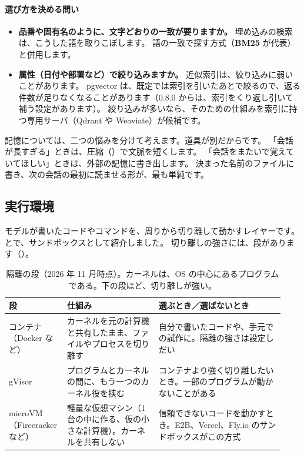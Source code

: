 \paragraph{選び方を決める問い}
\begin{itemize}[nosep,beginpenalty=10000]
\item \textbf{品番や固有名のように、文字どおりの一致が要りますか。}
  埋め込みの検索は、こうした語を取りこぼします。
  語の一致で探す方式（\textbf{BM25} が代表）と併用します。
\item \textbf{属性（日付や部署など）で絞り込みますか。}
  近似索引は、絞り込みに弱いことがあります。
  pgvector は、既定では索引を引いたあとで絞るので、返る件数が足りなくなることがあります（0.8.0 からは、索引をくり返し引いて補う設定があります）。
  絞り込みが多いなら、そのための仕組みを索引に持つ専用サーバ（Qdrant や Weaviate）が候補です。
\end{itemize}

記憶については、二つの悩みを分けて考えます。道具が別だからです。
「会話が長すぎる」ときは、圧縮（）で文脈を短くします。
「会話をまたいで覚えていてほしい」ときは、外部の記憶に書き出します。
決まった名前のファイルに書き、次の会話の最初に読ませる形が、最も単純です。

\subsection{実行環境}\label{sec:tm-sandbox}

モデルが書いたコードやコマンドを、周りから切り離して動かすレイヤーです。
とで、サンドボックスとして紹介しました。
切り離しの強さには、段があります（）。

\begin{table}[htbp]
\centering\footnotesize
\caption{隔離の段（2026 年 11 月時点）。カーネルは、OS の中心にあるプログラムである。下の段ほど、切り離しが強い。}
\label{tab:tm-sandbox}
\begin{tabular}{@{}>{\raggedright\arraybackslash}p{0.17\linewidth}>{\raggedright\arraybackslash}p{0.32\linewidth}>{\raggedright\arraybackslash}p{0.44\linewidth}@{}}
\toprule
段 & 仕組み & 選ぶとき／選ばないとき \\
\midrule
コンテナ（Docker など） & カーネルを元の計算機と共有したまま、ファイルやプロセスを切り離す & 自分で書いたコードや、手元での試作に。隔離の強さは設定しだい \\
\addlinespace[2pt]
gVisor & プログラムとカーネルの間に、もう一つのカーネル役を挟む & コンテナより強く切り離したいとき。一部のプログラムが動かないことがある \\
\addlinespace[2pt]
microVM（Firecracker など） & 軽量な仮想マシン（1 台の中に作る、仮の小さな計算機）。カーネルを共有しない & 信頼できないコードを動かすとき。E2B、Vercel、Fly.io のサンドボックスがこの方式 \\
\bottomrule
\end{tabular}
\end{table}

